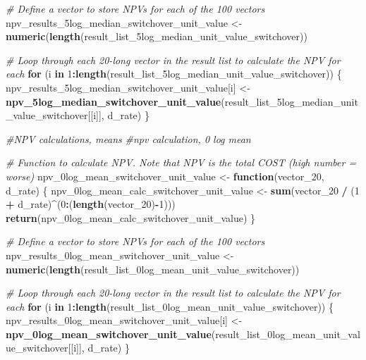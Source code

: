 \documentclass[
]{article}
\newenvironment{Shaded}{\begin{snugshade}}{\end{snugshade}}
\newcommand{\CommentTok}[1]{\textcolor[rgb]{0.56,0.35,0.01}{\textit{#1}}}
\newcommand{\ControlFlowTok}[1]{\textcolor[rgb]{0.13,0.29,0.53}{\textbf{#1}}}
\newcommand{\DecValTok}[1]{\textcolor[rgb]{0.00,0.00,0.81}{#1}}
\newcommand{\FunctionTok}[1]{\textcolor[rgb]{0.13,0.29,0.53}{\textbf{#1}}}
\newcommand{\NormalTok}[1]{#1}
\newcommand{\OtherTok}[1]{\textcolor[rgb]{0.56,0.35,0.01}{#1}}
\newcommand{\SpecialCharTok}[1]{\textcolor[rgb]{0.81,0.36,0.00}{\textbf{#1}}}
\begin{document}
\begin{Shaded}
\begin{Highlighting}[]
\CommentTok{\# Define a vector to store NPVs for each of the 100 vectors}
\NormalTok{npv\_results\_5log\_median\_switchover\_unit\_value }\OtherTok{\textless{}{-}} \FunctionTok{numeric}\NormalTok{(}\FunctionTok{length}\NormalTok{(result\_list\_5log\_median\_unit\_value\_switchover))}

\CommentTok{\# Loop through each 20{-}long vector in the result list to calculate the NPV for each}
\ControlFlowTok{for}\NormalTok{ (i }\ControlFlowTok{in} \DecValTok{1}\SpecialCharTok{:}\FunctionTok{length}\NormalTok{(result\_list\_5log\_median\_unit\_value\_switchover)) \{}
\NormalTok{  npv\_results\_5log\_median\_switchover\_unit\_value[i] }\OtherTok{\textless{}{-}} \FunctionTok{npv\_5log\_median\_switchover\_unit\_value}\NormalTok{(result\_list\_5log\_median\_unit\_value\_switchover[[i]], d\_rate)}
\NormalTok{\}}



\CommentTok{\#NPV calculations, means}
\CommentTok{\#npv calculation, 0 log mean}

\CommentTok{\# Function to calculate NPV. Note that NPV is the total COST (high number = worse)}
\NormalTok{npv\_0log\_mean\_switchover\_unit\_value }\OtherTok{\textless{}{-}} \ControlFlowTok{function}\NormalTok{(vector\_20, d\_rate) \{}
\NormalTok{  npv\_0log\_mean\_calc\_switchover\_unit\_value }\OtherTok{\textless{}{-}} \FunctionTok{sum}\NormalTok{(vector\_20 }\SpecialCharTok{/}\NormalTok{ (}\DecValTok{1} \SpecialCharTok{+}\NormalTok{ d\_rate)}\SpecialCharTok{\^{}}\NormalTok{(}\DecValTok{0}\SpecialCharTok{:}\NormalTok{(}\FunctionTok{length}\NormalTok{(vector\_20)}\SpecialCharTok{{-}}\DecValTok{1}\NormalTok{)))}
  \FunctionTok{return}\NormalTok{(npv\_0log\_mean\_calc\_switchover\_unit\_value)}
\NormalTok{\}}

\CommentTok{\# Define a vector to store NPVs for each of the 100 vectors}
\NormalTok{npv\_results\_0log\_mean\_switchover\_unit\_value }\OtherTok{\textless{}{-}} \FunctionTok{numeric}\NormalTok{(}\FunctionTok{length}\NormalTok{(result\_list\_0log\_mean\_unit\_value\_switchover))}

\CommentTok{\# Loop through each 20{-}long vector in the result list to calculate the NPV for each}
\ControlFlowTok{for}\NormalTok{ (i }\ControlFlowTok{in} \DecValTok{1}\SpecialCharTok{:}\FunctionTok{length}\NormalTok{(result\_list\_0log\_mean\_unit\_value\_switchover)) \{}
\NormalTok{  npv\_results\_0log\_mean\_switchover\_unit\_value[i] }\OtherTok{\textless{}{-}} \FunctionTok{npv\_0log\_mean\_switchover\_unit\_value}\NormalTok{(result\_list\_0log\_mean\_unit\_value\_switchover[[i]], d\_rate)}
\NormalTok{\}}



\end{Highlighting}
\end{Shaded}
\end{document}
